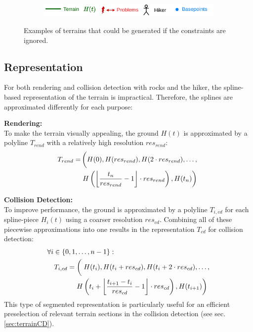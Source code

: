 \begin{figure}[htbp]
  \vspace{.3cm}
  \begin{subfigure}{\linewidth}
    \centering
    \includegraphics[width=\linewidth]{figures/constraints/Legend.pdf}
    \label{pic:constraintsLegend}
  \end{subfigure}
  \vspace{-3\abovedisplayskip}
  \caption{Examples of terrains that could be generated if the constraints are ignored.}
  \label{fig:constraints}
  \vspace{-\abovedisplayskip}
\end{figure}
\vspace{-\abovedisplayskip}

\subsection{Representation}

For both rendering and collision detection with rocks and the hiker, the spline-based representation of the terrain is impractical. 
Therefore, the splines are approximated differently for each purpose:

\noindent\textbf{Rendering:}\\
To make the terrain visually appealing, the ground $H(t)$ is approximated by a polyline $T_{rend}$ with a relatively high resolution $res_{rend}$:
\begin{align}
  T_{rend} = & \left(\vphantom{\floor*{\frac{t_n}{res_{rend}} - 1}}H(0), H(res_{rend}), H(2\cdot res_{rend}), \dots, \right. \notag\\
  & \left. H\left(\floor*{\frac{t_n}{res_{rend}} - 1}\cdot res_{rend}\right), H(t_n)\right)
\end{align}

\noindent\textbf{Collision Detection:}\\
To improve performance, the ground is approximated by a polyline $T_{i,cd}$ for each spline-piece $H_i(t)$ using a coarser resolution $res_{cd}$. Combining all of these piecewise approximations into one results in the representation $T_{cd}$ for collision detection:
\begin{align}
  & \forall i\in\{0,1, \dots, n-1\}:\notag\\
  & \quad T_{i, cd} = \left(\vphantom{\floor*{\frac{t_{i+1} - t_i}{res_{cd}} - 1}}\right.H(t_i), H(t_i + res_{cd}), H(t_i + 2\cdot res_{cd}), \dots, \notag\\
  & \quad \hphantom{T_{i, cd} = }\left.H\left(t_i + \floor*{\frac{t_{i+1} - t_i}{res_{cd}} - 1}\cdot res_{cd}\right), H(t_{i+1})\right)
\end{align}
This type of segmented representation is particularly useful for an efficient preselection of relevant terrain sections in the collision detection (see sec. \ref{sec:terrainCD}).